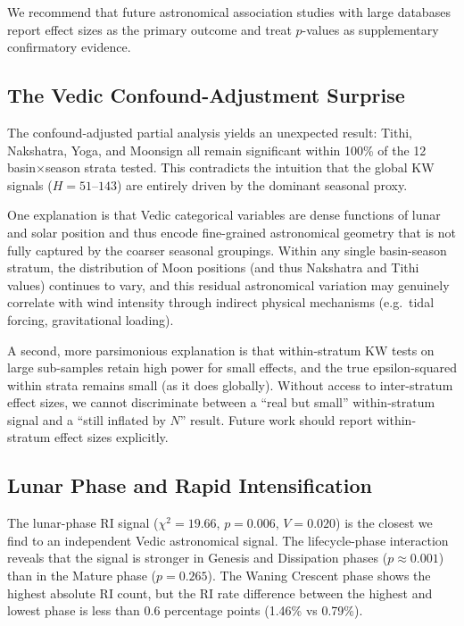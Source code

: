 \documentclass[12pt,a4paper]{article}
\begin{document}
We recommend that future astronomical association studies with large databases
report effect sizes as the primary outcome and treat $p$-values as supplementary
confirmatory evidence.

\subsection{The Vedic Confound-Adjustment Surprise}

The confound-adjusted partial analysis yields an unexpected result: Tithi,
Nakshatra, Yoga, and Moonsign all remain significant within 100\% of the
12 basin$\times$season strata tested.
This contradicts the intuition that the global KW signals ($H = 51$--$143$)
are entirely driven by the dominant seasonal proxy.

One explanation is that Vedic categorical variables are dense functions of
lunar and solar position and thus encode fine-grained astronomical geometry
that is not fully captured by the coarser seasonal groupings.
Within any single basin-season stratum, the distribution of Moon positions
(and thus Nakshatra and Tithi values) continues to vary, and this residual
astronomical variation may genuinely correlate with wind intensity through
indirect physical mechanisms (e.g.\ tidal forcing, gravitational loading).

A second, more parsimonious explanation is that within-stratum KW tests on
large sub-samples retain high power for small effects, and the true
epsilon-squared within strata remains small (as it does globally).
Without access to inter-stratum effect sizes, we cannot discriminate between
a ``real but small'' within-stratum signal and a ``still inflated by $N$''
result.
Future work should report within-stratum effect sizes explicitly.

\subsection{Lunar Phase and Rapid Intensification}

The lunar-phase RI signal ($\chi^2 = 19.66$, $p = 0.006$, $V = 0.020$) is
the closest we find to an independent Vedic astronomical signal.
The lifecycle-phase interaction reveals that the signal is stronger in Genesis
and Dissipation phases ($p \approx 0.001$) than in the Mature phase ($p = 0.265$).
The Waning Crescent phase shows the highest absolute RI count, but the RI rate
difference between the highest and lowest phase is less than 0.6 percentage
points (1.46\% vs 0.79\%).
\end{document}
